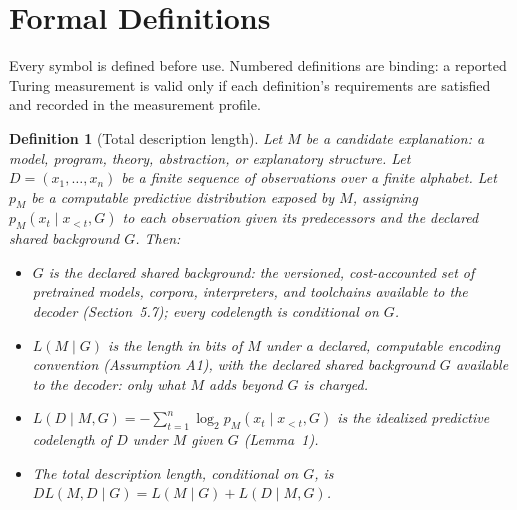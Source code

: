 \documentclass[11pt]{article}
\newtheorem{definition}{Definition}
\begin{document}
\section{Formal Definitions}

Every symbol is defined before use. Numbered definitions are binding: a reported Turing measurement is valid only if each definition's requirements are satisfied and recorded in the measurement profile.

\begin{definition}[Total description length]
Let \(M\) be a candidate explanation: a model, program, theory, abstraction, or explanatory structure. Let \(D=(x_1,\ldots,x_n)\) be a finite sequence of observations over a finite alphabet. Let \(p_M\) be a computable predictive distribution exposed by \(M\), assigning \(p_M(x_t\mid x_{<t},G)\) to each observation given its predecessors and the declared shared background \(G\). Then:
\begin{itemize}
\item \(G\) is the declared shared background: the versioned, cost-accounted set of pretrained models, corpora, interpreters, and toolchains available to the decoder (Section~5.7); every codelength is conditional on \(G\).
\item \(L(M\mid G)\) is the length in bits of \(M\) under a declared, computable encoding convention (Assumption A1), with the declared shared background \(G\) available to the decoder: only what \(M\) adds beyond \(G\) is charged.
\item \(L(D\mid M,G) = -\sum_{t=1}^{n} \log_2 p_M(x_t\mid x_{<t},G)\) is the idealized predictive codelength of \(D\) under \(M\) given \(G\) (Lemma~1).
\item The total description length, conditional on \(G\), is \(DL(M,D\mid G) = L(M\mid G) + L(D\mid M,G)\).
\end{itemize}
\end{definition}
\end{document}
